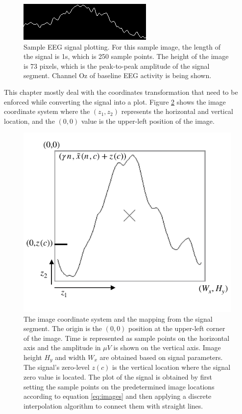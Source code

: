 \begin{figure}[]
\centering
\includegraphics[scale=1.5]{images/plottingsample.png}
\caption[EEG Signal Mapping to Images]{Sample EEG signal plotting.  For this sample image, the length of the signal is 1s, which is 250 sample points.  The height of the image is 73 pixels, which is the peak-to-peak amplitude of the signal segment.  Channel Oz of baseline EEG activity is being shown.}
\label{fig:plottingsample}
\end{figure}

This chapter mostly deal with the coordinates transformation that need to be enforced while converting the signal into a plot.  Figure \ref{fig:imagecoordinatesystem} shows the image coordinate system where the $(z_1,z_2)$ represents the horizontal and vertical location, and the $(0,0)$ value is the upper-left position of the image.

\begin{figure}[h!]
\centering
\includegraphics[scale=1.2]{images/imagecoordinatesystem.pdf}
\caption[Image Coordinate System]{The image coordinate system and the mapping from the signal segment.  The origin is the $(0,0)$ position at the upper-left corner of the image.  Time is represented as sample points on the horizontal axis and the amplitude in $\mu V$ is shown on the vertical axis. Image height $H_y$ and width $W_x$ are obtained based on signal parameters.  The signal's zero-level $z(c)$ is the vertical location where the signal zero value is located. The plot of the signal is obtained by first setting the sample points on the predetermined image locations according to equation \ref{eq:images} and then applying a discrete interpolation algorithm to connect them with straight lines. }
\label{fig:imagecoordinatesystem}
\end{figure}

